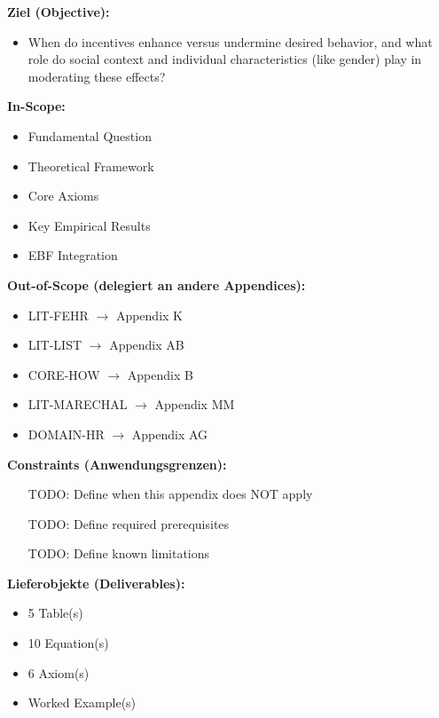 \begin{tcolorbox}[
    colback=orange!5!white,
    colframe=orange!75!black,
    title={\textbf{Appendix Scope: Ziel / In-Scope / Out-of-Scope / Constraints}},
    fonttitle=\bfseries
]

\textbf{Ziel (Objective):}
\begin{itemize}[nosep]
    \item When do incentives enhance versus undermine desired behavior, and what role do social context and individual characteristics (like gender) play in moderating these effects?
\end{itemize}

\textbf{In-Scope:}
\begin{itemize}[nosep]
    \item Fundamental Question
    \item Theoretical Framework
    \item Core Axioms
    \item Key Empirical Results
    \item EBF Integration
\end{itemize}

\textbf{Out-of-Scope (delegiert an andere Appendices):}
\begin{itemize}[nosep]
    \item LIT-FEHR $\rightarrow$ Appendix K
    \item LIT-LIST $\rightarrow$ Appendix AB
    \item CORE-HOW $\rightarrow$ Appendix B
    \item LIT-MARECHAL $\rightarrow$ Appendix MM
    \item DOMAIN-HR $\rightarrow$ Appendix AG
\end{itemize}

\textbf{Constraints (Anwendungsgrenzen):}
\begin{itemize}[nosep]
    \item [TODO: Define when this appendix does NOT apply]
    \item [TODO: Define required prerequisites]
    \item [TODO: Define known limitations]
\end{itemize}

\textbf{Lieferobjekte (Deliverables):}
\begin{itemize}[nosep]
    \item 5 Table(s)
    \item 10 Equation(s)
    \item 6 Axiom(s)
    \item Worked Example(s)
\end{itemize}

\end{tcolorbox}


